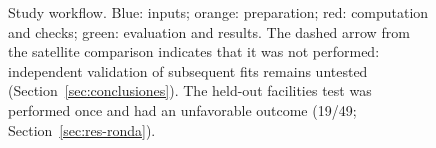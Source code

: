 \begin{figure}[htbp]
\caption{Study workflow. Blue: inputs; orange: preparation; red: computation and checks; green: evaluation and results. The dashed arrow from the satellite comparison indicates that it was not performed: independent validation of subsequent fits remains untested (Section~\ref{sec:conclusiones}). The held-out facilities test was performed once and had an unfavorable outcome (19/49; Section~\ref{sec:res-ronda}).}\label{fig:flujo}
\end{figure}
